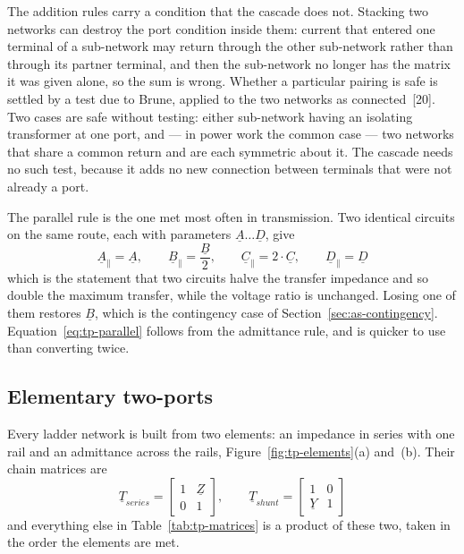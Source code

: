 The addition rules carry a condition that the cascade does not. Stacking two
networks can destroy the port condition inside them: current that entered
one terminal of a sub-network may return through the other sub-network
rather than through its partner terminal, and then the sub-network no longer
has the matrix it was given alone, so the sum is wrong. Whether a particular
pairing is safe is settled by a test due to Brune, applied to the two
networks as connected~[20]. Two cases are safe without testing: either
sub-network having an isolating transformer at one port, and --- in power
work the common case --- two networks that share a common return and are
each symmetric about it. The cascade needs no such test, because it adds no
new connection between terminals that were not already a port.

The parallel rule is the one met most often in transmission. Two identical
circuits on the same route, each with parameters $\underline{A} \ldots
\underline{D}$, give
\begin{equation}
  \underline{A}_{\parallel} = \underline{A},
  \qquad
  \underline{B}_{\parallel} = \frac{\underline{B}}{2},
  \qquad
  \underline{C}_{\parallel} = 2 \cdot \underline{C},
  \qquad
  \underline{D}_{\parallel} = \underline{D}
  \label{eq:tp-parallel}
\end{equation}
which is the statement that two circuits halve the transfer impedance and so
double the maximum transfer, while the voltage ratio is unchanged. Losing
one of them restores $\underline{B}$, which is the contingency case of
Section~\ref{sec:as-contingency}. Equation~\eqref{eq:tp-parallel} follows
from the admittance rule, and is quicker to use than converting twice.

\subsection{Elementary two-ports}
\label{sec:tp-elements}

Every ladder network is built from two elements: an impedance in series with
one rail and an admittance across the rails, Figure~\ref{fig:tp-elements}(a)
and~(b). Their chain matrices are
\begin{equation}
  \underline{T}_{series} =
  \begin{bmatrix} 1 & \underline{Z} \\ 0 & 1 \end{bmatrix},
  \qquad
  \underline{T}_{shunt} =
  \begin{bmatrix} 1 & 0 \\ \underline{Y} & 1 \end{bmatrix}
  \label{eq:tp-elements}
\end{equation}
and everything else in Table~\ref{tab:tp-matrices} is a product of these
two, taken in the order the elements are met.


